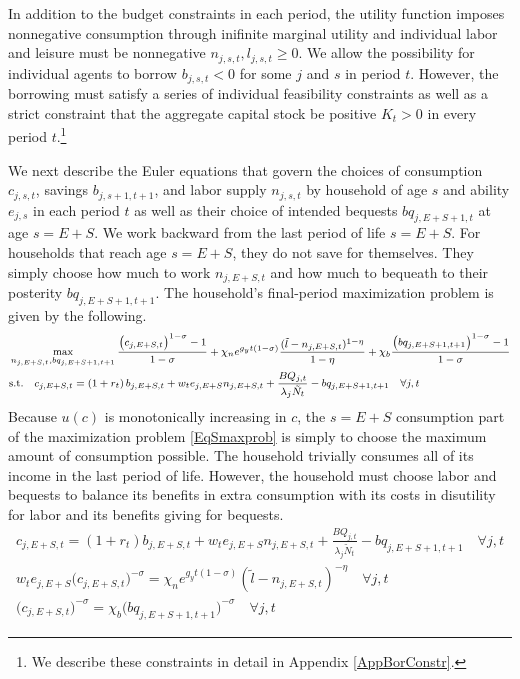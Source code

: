 \documentclass[letterpaper,12pt]{article}
\theoremstyle{definition}
\begin{document}
\begin{spacing}{1.5}
    In addition to the budget constraints in each period, the utility function imposes nonnegative consumption through inifinite marginal utility and individual labor and leisure must be nonnegative $n_{j,s,t},l_{j,s,t}\geq 0$. We allow the possibility for individual agents to borrow $b_{j,s,t}<0$ for some $j$ and $s$ in period $t$. However, the borrowing must satisfy a series of individual feasibility constraints as well as a strict constraint that the aggregate capital stock be positive $K_t>0$ in every period $t$.\footnote{We describe these constraints in detail in Appendix \ref{AppBorConstr}.}

    We next describe the Euler equations that govern the choices of consumption $c_{j,s,t}$, savings $b_{j,s+1,t+1}$, and labor supply $n_{j,s,t}$ by household of age $s$ and ability $e_{j,s}$ in each period $t$ as well as their choice of intended bequests $bq_{j,E+S+1,t}$ at age $s=E+S$. We work backward from the last period of life $s=E+S$. For households that reach age $s=E+S$, they do not save for themselves. They simply choose how much to work $n_{j,E+S,t}$ and how much to bequeath to their posterity $bq_{j,E+S+1,t+1}$. The household's final-period maximization problem is given by the following.
    \begin{equation}\label{EqSmaxprob}
      \footnotesize{\begin{split}
        &\max_{n_{j,E+S,t},bq_{j,E+S+1,t+1}} \frac{\left(c_{j,E+S,t}\right)^{1-\sigma} - 1}{1 - \sigma} + \chi_n e^{g_y t(1-\sigma)}\frac{(\tilde{l}-n_{j,E+S,t})^{1-\eta}}{1-\eta} + \chi_b\frac{\left(bq_{j,E+S+1,t+1}\right)^{1-\sigma} - 1}{1 - \sigma} \\
        &\text{s.t.} \quad c_{j,E+S,t} = \left(1 + r_t\right) b_{j,E+S,t} + w_t e_{j,E+S}n_{j,E+S,t} + \frac{BQ_{j,t}}{\lambda_j\tilde{N}_t} - bq_{j,E+S+1,t+1} \quad \forall j,t
      \end{split}}
    \end{equation}
    Because $u(c)$ is monotonically increasing in $c$, the $s=E+S$ consumption part of the maximization problem \eqref{EqSmaxprob} is simply to choose the maximum amount of consumption possible. The household trivially consumes all of its income in the last period of life. However, the household must choose labor and bequests to balance its benefits in extra consumption with its costs in disutility for labor and its benefits giving for bequests.
    \small{\begin{gather}
      c_{j,E+S,t} = \left(1 + r_t\right) b_{j,E+S,t} + w_t e_{j,E+S}n_{j,E+S,t} + \frac{BQ_{j,t}}{\lambda_j\tilde{N}_t} - bq_{j,E+S+1,t+1} \quad \forall j,t \label{EqScons} \\
      w_t e_{j,E+S}\bigl(c_{j,E+S,t}\bigr)^{-\sigma} = \chi_n e^{g_y t(1-\sigma)}(\tilde{l} - n_{j,E+S,t})^{-\eta} \quad\forall j,t \label{EqEulerSlab} \\
      \bigl(c_{j,E+S,t}\bigr)^{-\sigma} = \chi_b\bigl(bq_{j,E+S+1,t+1}\bigr)^{-\sigma} \quad\forall j,t \label{EqEulerSbeq}
    \end{gather}}


\end{spacing}
\end{document}
